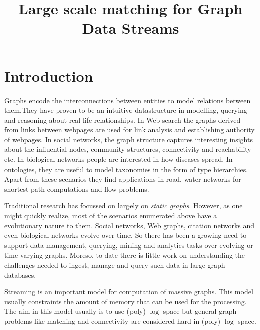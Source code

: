 \documentclass{scrartcl}
\begin{document}
  
 \title{Large scale matching for Graph Data Streams}
 \maketitle

\section{Introduction}

Graphs encode the interconnections between entities to model relations between them.They have proven to be an intuitive datastructure in modelling, querying and reasoning about real-life relationships. In Web search the graphs derived from links between webpages are used for link analysis and establishing authority of webpages. In social networks, the graph structure captures interesting insights about the influential nodes, community structures, connectivity and reachability etc. In biological networks people are interested in how diseases spread. In ontologies, they are useful to model taxonomies in the form of type hierarchies. Apart from these scenarios they find applications in road, water networks for shortest path computations and flow problems.

Traditional research has focussed on largely on \emph{static graphs}. However, as one might quickly realize, most of the scenarios enumerated above have a evolutionary nature to them. Social networks, Web graphs, citation networks and even biological networks evolve over time. So there has been a growing need to support data management, querying, mining and analytics tasks over evolving or time-varying graphs.  Moreso, to date there is little work on understanding the challenges needed to ingest, manage and query such data in large graph databases. 

Streaming is an important model for computation of massive graphs. This model usually constraints the amount of memory that can be used for the processing. The aim in this model usually is to use (poly) $\log$ space but general graph problems like matching and connectivity are considered hard in (poly) $\log$ space. 
\end{document}
